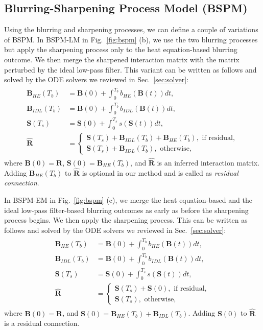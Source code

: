 \documentclass[sigconf,natbib=true]{acmart}
\begin{document}
\subsection{Blurring-Sharpening Process Model (BSPM)}
Using the blurring and sharpening processes, we can define a couple of variations of BSPM. In BSPM-LM in Fig.~\ref{fig:bspm} (b), we use the two blurring processes but apply the sharpening process only to the heat equation-based blurring outcome. We then merge the sharpened interaction matrix with the matrix perturbed by the ideal low-pass filter. This variant can be written as follows and solved by the ODE solvers we reviewed in Sec.~\ref{sec:solver}:
\begin{align}\begin{split}\label{eq:bspm1}
    \bm{B}_{HE}(T_b) &= \bm{B}(0) + \int_0^{T_b} b_{HE}(\bm{B}(t)) dt,\\
    \bm{B}_{IDL}(T_b) &= \bm{B}(0) + \int_0^{T_b} b_{IDL}(\bm{B}(t)) dt,\\
    \bm{S}(T_s) &= \bm{S}(0) + \int_0^{T_s} s(\bm{S}(t)) dt,\\
    \hat{\bm{R}} &= \begin{cases}
    \bm{S}(T_s) + \bm{B}_{IDL}(T_b) + \bm{B}_{HE}(T_b),\textrm{ if residual},\\
    \bm{S}(T_s) + \bm{B}_{IDL}(T_b),\textrm{ otherwise},
    \end{cases}
\end{split}\end{align}where $\bm{B}(0) = \bm{R}$, $\bm{S}(0) = \bm{B}_{HE}(T_b)$, and $\hat{\bm{R}}$ is an inferred interaction matrix. Adding $\bm{B}_{HE}(T_b)$ to $\hat{\bm{R}}$ is optional in our method and is called as \emph{residual connection}.

In BSPM-EM in Fig.~\ref{fig:bspm} (c), we merge the heat equation-based and the ideal low-pass filter-based blurring outcomes as early as before the sharpening process begins. We then apply the sharpening process. This can be written as follows and solved by the ODE solvers we reviewed in Sec.~\ref{sec:solver}:
\begin{align}\begin{split}\label{eq:bspm2}
    \bm{B}_{HE}(T_b) &= \bm{B}(0) + \int_0^{T_b} b_{HE}(\bm{B}(t)) dt,\\
    \bm{B}_{IDL}(T_b) &= \bm{B}(0) + \int_0^{T_b} b_{IDL}(\bm{B}(t)) dt,\\
    \bm{S}(T_s) &= \bm{S}(0) + \int_0^{T_s} s(\bm{S}(t)) dt,\\
    \hat{\bm{R}} &= \begin{cases}
    \bm{S}(T_s) + \bm{S}(0),\textrm{ if residual},\\
    \bm{S}(T_s),\textrm{ otherwise},
    \end{cases}
\end{split}\end{align}where $\bm{B}(0) = \bm{R}$, and $\bm{S}(0) = \bm{B}_{HE}(T_b) + \bm{B}_{IDL}(T_b)$. Adding $\bm{S}(0)$ to $\hat{\bm{R}}$ is a residual connection.
\end{document}
